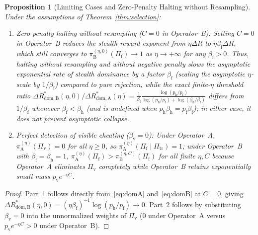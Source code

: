 \documentclass[11pt,a4paper]{article}
\newtheorem{proposition}[theorem]{Proposition}
\begin{document}
\begin{proposition}[Limiting Cases and Zero-Penalty Halting without Resampling]\label{prop:limits}
Under the assumptions of Theorem~\ref{thm:selection}:
\begin{enumerate}
  \item \emph{Zero-penalty halting without resampling ($C = 0$ in Operator~B):} Setting $C = 0$ in Operator~B reduces the stealth reward exponent from $\eta\Delta R$ to $\eta\beta_{\mathrm{f}}\Delta R$, which still converges to $\pi_{\mathrm{B}}^{(\eta, 0)}(\Pi_{\mathrm{f}}) \to 1$ as $\eta \to +\infty$ for any $\beta_{\mathrm{f}} > 0$. Thus, halting without resampling and without negative penalty slows the asymptotic exponential rate of stealth dominance by a factor $\beta_{\mathrm{f}}$ (scaling the asymptotic $\eta$-scale by $1/\beta_{\mathrm{f}}$) compared to pure rejection, while the exact finite-$\eta$ threshold ratio $\Delta R_{\mathrm{dom, B}}^*(\eta, 0)/\Delta R_{\mathrm{dom, A}}^*(\eta) = \frac{1}{\beta_{\mathrm{f}}}\frac{\log(p_{\mathrm{h}}/p_{\mathrm{f}})}{\log(p_{\mathrm{h}}/p_{\mathrm{f}}) + \log(\beta_{\mathrm{h}}/\beta_{\mathrm{f}})}$ differs from $1/\beta_{\mathrm{f}}$ whenever $\beta_{\mathrm{f}} < \beta_{\mathrm{h}}$ (and is undefined when $p_{\mathrm{h}}\beta_{\mathrm{h}} = p_{\mathrm{f}}\beta_{\mathrm{f}}$); in either case, it does not prevent asymptotic collapse.
  \item \emph{Perfect detection of visible cheating ($\beta_{\mathrm{v}} = 0$):} Under Operator~A, $\pi_{\mathrm{A}}^{(\eta)}(\Pi_{\mathrm{v}}) = 0$ for all $\eta \ge 0$, so $\pi_{\mathrm{A}}^{(\eta)}(\Pi_{\mathrm{f}} \mid \Pi_{\mathrm{tr}}) = 1$; under Operator~B with $\beta_{\mathrm{f}} = \beta_{\mathrm{h}} = 1$, $\pi_{\mathrm{A}}^{(\eta)}(\Pi_{\mathrm{f}}) > \pi_{\mathrm{B}}^{(\eta, C)}(\Pi_{\mathrm{f}})$ for all finite $\eta, C$ because Operator~A eliminates $\Pi_{\mathrm{v}}$ completely while Operator~B retains exponentially small mass $p_{\mathrm{v}} e^{-\eta C}$.
\end{enumerate}
\end{proposition}

\begin{proof}
Part~1 follows directly from~\eqref{eq:domA} and~\eqref{eq:domB} at $C = 0$, giving $\Delta R_{\mathrm{dom, B}}^*(\eta, 0) = (\eta\beta_{\mathrm{f}})^{-1}\log(p_{\mathrm{h}}/p_{\mathrm{f}}) \to 0$. Part~2 follows by substituting $\beta_{\mathrm{v}} = 0$ into the unnormalized weights of $\Pi_{\mathrm{v}}$ ($0$ under Operator~A versus $p_{\mathrm{v}} e^{-\eta C} > 0$ under Operator~B).
\end{proof}
\end{document}
